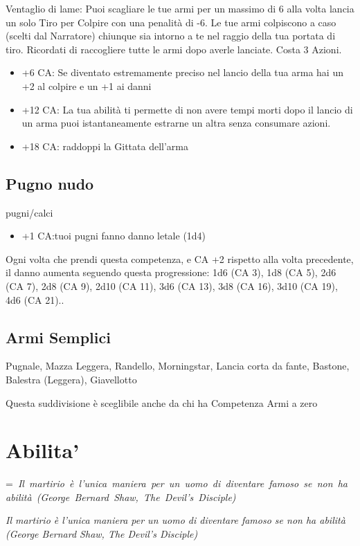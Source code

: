 \documentclass[a4paper,11pt,twoside,openany]{book}
\makeatletter
\newcommand{\mybox}[1]{%
	\setbox0=\hbox{#1}%
	\setlength{\@tempdima}{\dimexpr\wd0+13pt}%
	\begin{tcolorbox}[boxrule=0.5pt,arc=4pt, breakable,enhanced,
		left=6pt,right=6pt,top=6pt,bottom=6pt,boxsep=0pt,width=\@tempdima]
		#1
	\end{tcolorbox}
}
\makeatother
\begin{document}
Ventaglio di lame: Puoi scagliare le tue armi per un massimo di 6 alla volta lancia un solo Tiro per Colpire con una penalità di -6. Le tue armi colpiscono a caso (scelti dal Narratore) chiunque sia intorno a te nel raggio della tua portata di tiro. Ricordati di raccogliere tutte le armi dopo averle lanciate. Costa 3 Azioni.

\begin{itemize}
\item +6 CA: Se diventato estremamente preciso nel lancio della tua arma hai un +2 al colpire e un +1 ai danni

\item +12 CA: La tua abilità ti permette di non avere tempi morti dopo il lancio di un arma puoi istantaneamente estrarne un altra senza consumare azioni.

\item +18 CA: raddoppi la Gittata dell'arma
\end{itemize}

\subsection{Pugno nudo} pugni/calci

\begin{itemize}
	\item +1 CA:tuoi pugni fanno danno letale (1d4)
\end{itemize}

Ogni volta che prendi questa competenza, e CA +2 rispetto alla volta precedente, il danno aumenta seguendo questa progressione: 1d6 (CA 3), 1d8 (CA 5), 2d6 (CA 7), 2d8 (CA 9), 2d10 (CA 11), 3d6 (CA 13), 3d8 (CA 16), 3d10 (CA 19), 4d6 (CA 21)..

\subsection{Armi Semplici} Pugnale, Mazza Leggera, Randello, Morningstar, Lancia corta da fante, Bastone, Balestra (Leggera), Giavellotto

Questa suddivisione è sceglibile anche da chi ha Competenza Armi a zero 

\pagebreak

\section{Abilita'}

\label{abilita}
\mybox{\textit{
Il martirio è l'unica maniera per un uomo di diventare famoso se non ha abilità (George Bernard Shaw, The Devil's Disciple)
}}\medskip
\end{document}
